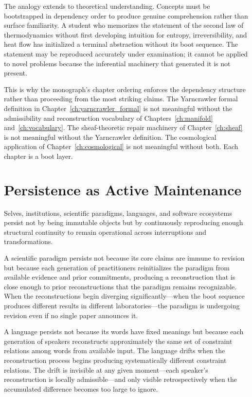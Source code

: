 \claimP The analogy extends to theoretical understanding. Concepts must be
bootstrapped in dependency order to produce genuine comprehension rather than
surface familiarity. A student who memorizes the statement of the second law of
thermodynamics without first developing intuition for entropy, irreversibility,
and heat flow has initialized a terminal abstraction without its boot sequence.
The statement may be reproduced accurately under examination; it cannot be applied
to novel problems because the inferential machinery that generated it is not present.

This is why the monograph's chapter ordering enforces the dependency structure
rather than proceeding from the most striking claims. The Yarncrawler formal
definition in Chapter~\ref{ch:yarncrawler_formal} is not meaningful without the
admissibility and reconstruction vocabulary of Chapters~\ref{ch:manifold}
and~\ref{ch:vocabulary}. The sheaf-theoretic repair machinery of
Chapter~\ref{ch:sheaf} is not meaningful without the Yarncrawler definition.
The cosmological application of Chapter~\ref{ch:cosmological} is not meaningful
without both. Each chapter is a boot layer.

\section{Persistence as Active Maintenance}

Selves, institutions, scientific paradigms, languages, and software ecosystems
persist not by being immutable objects but by continuously reproducing enough
structural continuity to remain operational across interruptions and
transformations.

\claimP A scientific paradigm persists not because its core claims are immune
to revision but because each generation of practitioners reinitializes the
paradigm from available evidence and prior commitments, producing a reconstruction
that is close enough to prior reconstructions that the paradigm remains recognizable.
When the reconstructions begin diverging significantly---when the boot sequence
produces different results in different laboratories---the paradigm is undergoing
revision even if no single paper announces it.

\claimP A language persists not because its words have fixed meanings but because
each generation of speakers reconstructs approximately the same set of
constraint relations among words from available input. The language drifts when
the reconstruction process begins producing systematically different constraint
relations. The drift is invisible at any given moment---each speaker's reconstruction
is locally admissible---and only visible retrospectively when the accumulated
difference becomes too large to ignore.

